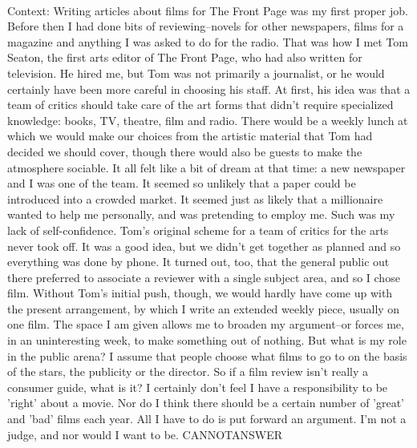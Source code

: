 \documentclass[11pt,a4paper, onecolumn]{article}
\begin{document}
\\ Context: Writing articles about films for The Front Page was my first proper job. Before then I had done bits of reviewing--novels for other newspapers, films for a magazine and anything I was asked to do for the radio. That was how I met Tom Seaton, the first arts editor of The Front Page, who had also written for television. He hired me, but Tom was not primarily a journalist, or he would certainly have been more careful in choosing his staff. At first, his idea was that a team of critics should take care of the art forms that didn't require specialized knowledge: books, TV, theatre, film and radio. There would be a weekly lunch at which we would make our choices from the artistic material that Tom had decided we should cover, though there would also be guests to make the atmosphere sociable. It all felt like a bit of dream at that time: a new newspaper and I was one of the team. It seemed so unlikely that a paper could be introduced into a crowded market. It seemed just as likely that a millionaire wanted to help me personally, and was pretending to employ me. Such was my lack of self-confidence. Tom's original scheme for a team of critics for the arts never took off. It was a good idea, but we didn't get together as planned and so everything was done by phone. It turned out, too, that the general public out there preferred to associate a reviewer with a single subject area, and so I chose film. Without Tom's initial push, though, we would hardly have come up with the present arrangement, by which I write an extended weekly piece, usually on one film. The space I am given allows me to broaden my argument--or forces me, in an uninteresting week, to make something out of nothing. But what is my role in the public arena? I assume that people choose what films to go to on the basis of the stars, the publicity or the director. So if a film review isn't really a consumer guide, what is it? I certainly don't feel I have a responsibility to be 'right' about a movie. Nor do I think there should be a certain number of 'great' and 'bad' films each year. All I have to do is put forward an argument. I'm not a judge, and nor would I want to be. CANNOTANSWER
\end{document}
